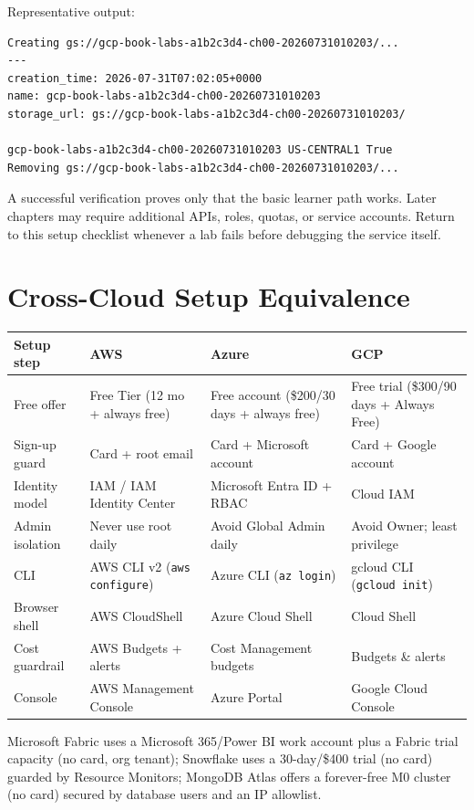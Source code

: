 Representative output:

\begin{lstlisting}[language=bash,caption={Representative output from the bucket verification script.},label={lst:chapter0-bucket-output}]
Creating gs://gcp-book-labs-a1b2c3d4-ch00-20260731010203/...
---
creation_time: 2026-07-31T07:02:05+0000
name: gcp-book-labs-a1b2c3d4-ch00-20260731010203
storage_url: gs://gcp-book-labs-a1b2c3d4-ch00-20260731010203/

gcp-book-labs-a1b2c3d4-ch00-20260731010203 US-CENTRAL1 True
Removing gs://gcp-book-labs-a1b2c3d4-ch00-20260731010203/...
\end{lstlisting}

\begin{notebox}
A successful verification proves only that the basic learner path works. Later chapters may require additional APIs, roles, quotas, or service accounts. Return to this setup checklist whenever a lab fails before debugging the service itself.
\end{notebox}

\section{Cross-Cloud Setup Equivalence}
\begin{crosscloud}
{\footnotesize
\begin{tabular}{@{}p{2.9cm}p{3.0cm}p{3.0cm}p{3.0cm}@{}}
\toprule
\textbf{Setup step} & \textbf{AWS} & \textbf{Azure} & \textbf{GCP} \\
\midrule
Free offer & Free Tier (12 mo + always free) & Free account (\$200/30 days + always free) & Free trial (\$300/90 days + Always Free) \\
Sign-up guard & Card + root email & Card + Microsoft account & Card + Google account \\
Identity model & IAM / IAM Identity Center & Microsoft Entra ID + RBAC & Cloud IAM \\
Admin isolation & Never use root daily & Avoid Global Admin daily & Avoid Owner; least privilege \\
CLI & AWS CLI v2 (\texttt{aws configure}) & Azure CLI (\texttt{az login}) & gcloud CLI (\texttt{gcloud init}) \\
Browser shell & AWS CloudShell & Azure Cloud Shell & Cloud Shell \\
Cost guardrail & AWS Budgets + alerts & Cost Management budgets & Budgets \& alerts \\
Console & AWS Management Console & Azure Portal & Google Cloud Console \\
\bottomrule
\end{tabular}}

Microsoft Fabric uses a Microsoft 365/Power BI work account plus a Fabric trial capacity (no card, org tenant); Snowflake uses a 30-day/\$400 trial (no card) guarded by Resource Monitors; MongoDB Atlas offers a forever-free M0 cluster (no card) secured by database users and an IP allowlist.
\end{crosscloud}

